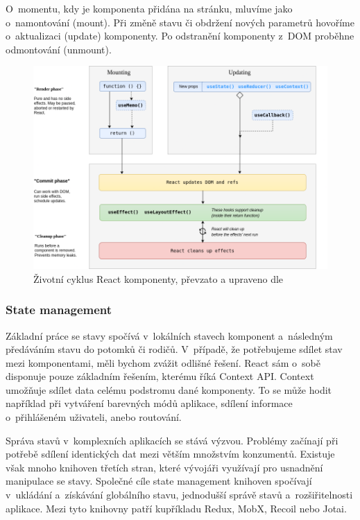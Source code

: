 O~momentu, kdy je komponenta přidána na stránku, mluvíme jako o~namontování (mount). Při změně stavu či obdržení nových parametrů hovoříme o~aktualizaci (update) komponenty. 
Po odstranění komponenty z~DOM proběhne odmontování (unmount).\cite{reactlifecycle, react}

\begin{figure}[htb]
	\centering
		\includegraphics[width=.8\textwidth]{images/reactlifecycle.png}
	\caption[Životní cyklus React komponenty]{Životní cyklus React komponenty, převzato a upraveno dle \cite{reactlifecyclediagram}}
	\label{fig:reactlifecycle}
\end{figure}

\subsubsection{State management}

Základní práce se stavy spočívá v~lokálních stavech komponent a~následným předáváním stavu do potomků či rodičů. 
V~případě, že potřebujeme sdílet stav mezi komponentami, měli bychom zvážit odlišné řešení. React sám o~sobě disponuje pouze základním řešením, kterému říká Context API. 
Context umožňuje sdílet data celému podstromu dané komponenty. 
To se může hodit například při vytváření barevných módů aplikace, sdílení informace o~přihlášeném uživateli, anebo routování.\cite{react}

Správa stavů v~komplexních aplikacích se stává výzvou. Problémy začínají při potřebě sdílení identických dat mezi větším množstvím konzumentů. 
Existuje však mnoho knihoven třetích stran, které vývojáři využívají pro usnadnění manipulace se stavy. 
Společné cíle state management knihoven spočívají v~ukládání a~získávání globálního stavu, jednodušší správě stavů a~rozšiřitelnosti aplikace.
Mezi tyto knihovny patří kupříkladu Redux, MobX, Recoil nebo Jotai.\cite{statemanagementreact,reactstatemanagement}


